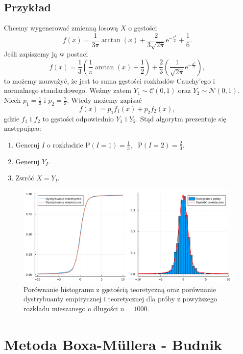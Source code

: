 \documentclass[12pt]{mwrep}
\begin{document}
	\subsection{Przykład}
	\noindent Chcemy wygenerować zmienną losową $X$ o gęstości
	$$ f(x) = \frac{1}{3\pi}\arctan(x) + \frac{2}{3\sqrt{2\pi}}\mathrm{e}^{-\frac{x^2}{2}} + \frac{1}{6}. $$
	Jeśli zapiszemy ją w postaci
	$$ f(x) = \frac{1}{3}\left(\frac{1}{\pi}\arctan(x) + \frac{1}{2}\right) + \frac{2}{3}\left(\frac{1}{\sqrt{2\pi}}\mathrm{e}^{-\frac{x^2}{2}}\right), $$
	to możemy zauważyć, że jest to suma gęstości rozkładów Cauchy'ego i normalnego standardowego. Weźmy zatem $Y_1 \sim \mathcal{C}(0, 1)$ oraz $Y_2 \sim \mathcal{N}(0, 1)$. Niech $p_1 = \frac{1}{3}$ i $p_2 = \frac{2}{3}$. Wtedy możemy zapisać
	$$ f(x) = p_1 f_1(x) + p_2 f_2(x), $$
	gdzie $f_1$ i $f_2$ to gęstości odpowiednio $Y_1$ i $Y_2$. Stąd algorytm prezentuje się następująco:
	\begin{enumerate}[leftmargin=10mm]
		\item Generuj $I$ o rozkładzie $\mathrm{P}(I = 1) = \frac{1}{3}$, \ $\mathrm{P}(I = 2) = \frac{2}{3}$.
		\item Generuj $Y_I$.
		\item Zwróć $X = Y_I$.
	\end{enumerate}
	\begin{figure}[H]
		\centering
		\caption{Porównanie histogramu z gęstością teoretyczną oraz porównanie dystrybuanty empirycznej i teoretycznej dla próby z powyższego rozkładu mieszanego o długości $n = 1000$.}
		\includegraphics[scale=0.1]{fig/fig_komp.png}
	\end{figure}



	
	\section{Metoda Boxa-M{\"u}llera\textsuperscript{\cite{box-kox}} - Budnik}
\end{document}
